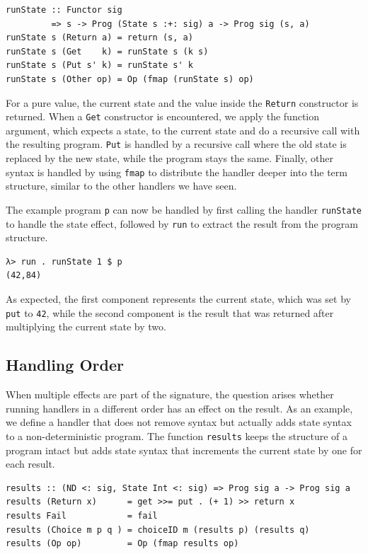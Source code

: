 \documentclass[a4paper, 11pt, fleqn, twoside]{scrreprt}
\newcommand{\hinl}[1]{\texttt{#1}}
\begin{document}
\begin{verbatim}
runState :: Functor sig 
         => s -> Prog (State s :+: sig) a -> Prog sig (s, a)
runState s (Return a) = return (s, a)
runState s (Get    k) = runState s (k s)
runState s (Put s' k) = runState s' k
runState s (Other op) = Op (fmap (runState s) op)
\end{verbatim}

For a pure value, the current state and the value inside the \hinl{Return} constructor is returned.
When a \hinl{Get} constructor is encountered, we apply the function argument, which expects a state, to the current state and do a recursive call with the resulting program.
\hinl{Put} is handled by a recursive call where the old state is replaced by the new state, while the program stays the same.
Finally, other syntax is handled by using \hinl{fmap} to distribute the handler deeper into the term structure, similar to the other handlers we have seen.

The example program \hinl{p} can now be handled by first calling the handler \hinl{runState} to handle the state effect, followed by \hinl{run} to extract the result from the program structure.

\begin{verbatim}
λ> run . runState 1 $ p
(42,84)
\end{verbatim}

As expected, the first component represents the current state, which was set by \hinl{put} to \hinl{42}, while the second component is the result that was returned after multiplying the current state by two.

\subsection{Handling Order}
When multiple effects are part of the signature, the question arises whether running handlers in a different order has an effect on the result.
As an example, we define a handler that does not remove syntax but actually adds state syntax to a non-deterministic program.
The function \hinl{results} keeps the structure of a program intact but adds state syntax that increments the current state by one for each result.

\begin{verbatim}
results :: (ND <: sig, State Int <: sig) => Prog sig a -> Prog sig a
results (Return x)      = get >>= put . (+ 1) >> return x
results Fail            = fail
results (Choice m p q ) = choiceID m (results p) (results q)
results (Op op)         = Op (fmap results op)
\end{verbatim}
\end{document}
